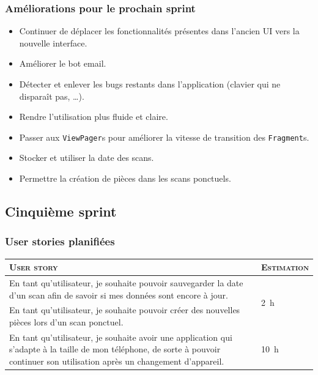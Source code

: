 \documentclass{elsarticle}
\newcommand{\est}[1]{\multirow{2}{*}{\SI{#1}{\hour}}}
\begin{document}
\subsubsection{Améliorations pour le prochain sprint}
\begin{itemize}
	\item Continuer de déplacer les fonctionnalités présentes dans l'ancien UI vers la nouvelle interface.
	\item Améliorer le bot email.
	\item Détecter et enlever les bugs restants dans l'application (clavier qui ne disparaît pas, \ldots).
	\item Rendre l'utilisation plus fluide et claire.
	\item Passer aux \texttt{ViewPager}s pour améliorer la vitesse de transition des \texttt{Fragment}s.
	\item Stocker et utiliser la date des scans.
	\item Permettre la création de pièces dans les scans ponctuels.
\end{itemize}

\subsection{Cinquième sprint}
\subsubsection{User stories planifiées}
\begin{table}[H]
\centering
\begin{tabular}{p{14cm}m{2cm}}
	\toprule
	\textsc{User story} & \textsc{Estimation}\\
	\midrule
	En tant qu'utilisateur, je souhaite pouvoir sauvegarder la date d'un scan afin de savoir si mes données sont encore à jour. & \est{2}\\
	\midrule
	En tant qu'utilisateur, je souhaite pouvoir créer des nouvelles pièces lors d'un scan ponctuel. & \est{5}\\
	\midrule
	En tant qu'utilisateur, je souhaite avoir une application qui s'adapte à la taille de mon téléphone, de sorte à pouvoir continuer son utilisation après un changement d'appareil. & \est{10}\\
	\bottomrule
\end{tabular}
\end{table}
\end{document}
